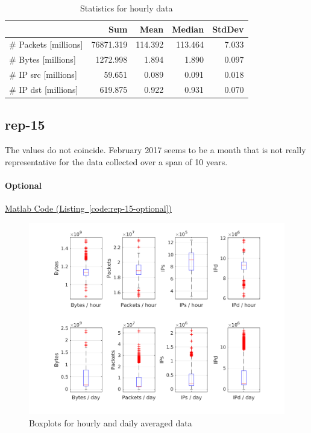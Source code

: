 \documentclass{article}
\newcommand{\codelink}[1]{%
    \hyperref[#1]{\faArrowCircleRight\enskip Matlab Code (Listing~\ref{#1})}%
}
\begin{document}
\begin{table}[h]
    \centering
    \begin{tabular}{l|rrrr}
                & Sum & Mean & Median & StdDev \\
                \hline
        \# Packets [millions] &    76871.319 & 114.392 & 113.464 & 7.033 \\
        \# Bytes  [millions]  &    1272.998  &1.894 & 1.890 & 0.097      \\
        \# IP src  [millions]    & 59.651 & 0.089 & 0.091 & 0.018        \\
        \# IP dst   [millions]   & 619.875 & 0.922 & 0.931 & 0.070       \\
    \end{tabular}
    \caption{\label{table:rep-14-hourly} Statistics for hourly data}
\end{table}

\subsection{rep-15}

The values do not coincide. February 2017 seems to be a month that is not really representative for the
data collected over a span of 10 years.

\paragraph{Optional}
\codelink{code:rep-15-optional}

\begin{figure}[h]
    \centering
    \includegraphics[width=\textwidth]{../exercise-3/plots/rep_15_optional}
    \caption{\label{figure:rep-15-optional} Boxplots for hourly and daily averaged data}
\end{figure}
\end{document}
